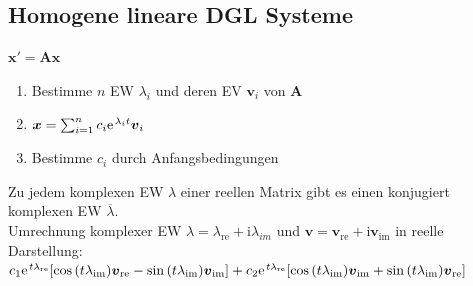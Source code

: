 \documentclass[6pt,a4paper]{scrartcl}
\let\olddot = \dot
\newcommand{\mat}[1]{\ensuremath{\begin{bmatrix} #1 \end{bmatrix}}}                             %
\newcommand{\ma}[1]{\ensuremath{\boldsymbol {#1}}}                                              %
\newcommand{\vect}[1]{\ensuremath{\begin{pmatrix} #1 \end{pmatrix}}}                            %
\newcommand{\svdots}{\ensuremath{\olddot :}}                                                    %
\renewcommand{\vec}[1]{\ensuremath{\boldsymbol {#1}}}                                           %
\renewcommand*{\dot}[1]{\accentset{\mbox{\textrm{\large\bfseries .}} }{#1}}                     %
\newcommand{\ol}[1]{\ensuremath{\overline{#1}}}                                %
\newcommand{\ra}[0]{\ensuremath{\rightarrow}}                                  %
\renewcommand{\i}{\ensuremath{\mathrm{i}}}                                     %
\newcommand{\R}{\ensuremath{\mathbb R}}
\begin{document}
\begin{multicols*}{4}
    \subsection{Homogene lineare DGL Systeme}




    $\boxed{\vec x'= \ma A\vec x}$
    \begin{enumerate}
        \item Bestimme $n$ EW $\lambda_i$ und deren EV $\vec v_i$ von $\ma A$
        \item $\vec x = \sum_{i=1}^n c_i\e^{\lambda_it}\vec v_i$
        \item Bestimme $c_i$ durch Anfangsbedingungen

    \end{enumerate}
    Zu jedem komplexen EW $\lambda$ einer reellen Matrix gibt es einen konjugiert komplexen EW $\ol \lambda$.\\
    Umrechnung komplexer EW $\lambda = \lambda_{\text{re}}+ \i \lambda_{im}$ und $\vec v = \vec v_{\text{re}} + \i \vec v_{\text{im}}$ in reelle Darstellung: \\
    $c_1 \e^{t\lambda_{\text{re}}}[\cos{(t\lambda_{\text{im}})}\vec v_{\text{re}} - \sin{(t\lambda_{\text{im}})}\vec v_{\text{im}}]+c_2\e^{t\lambda_{\text{re}}}[\cos{(t\lambda_{\text{im}})}\vec v_{\text{im}}+\sin{(t\lambda_{\text{im}})}\vec v_{\text{re}}]$


\end{multicols*}
\end{document}
